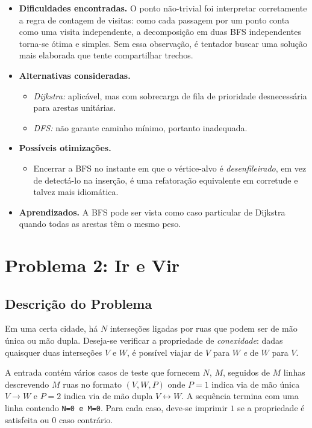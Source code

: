 \documentclass[11pt,a4paper]{article}
\begin{document}
\begin{itemize}
    \item \textbf{Dificuldades encontradas.} O ponto não-trivial foi
    interpretar corretamente a regra de contagem de visitas: como cada
    passagem por um ponto conta como uma visita independente, a
    decomposição em duas BFS independentes torna-se ótima e simples.
    Sem essa observação, é tentador buscar uma solução mais elaborada
    que tente compartilhar trechos.

    \item \textbf{Alternativas consideradas.}
    \begin{itemize}
        \item \emph{Dijkstra:} aplicável, mas com sobrecarga de fila
        de prioridade desnecessária para arestas unitárias.
        \item \emph{DFS:} não garante caminho mínimo, portanto
        inadequada.
    \end{itemize}

    \item \textbf{Possíveis otimizações.}
    \begin{itemize}
        \item Encerrar a BFS no instante em que o vértice-alvo é
        \emph{desenfileirado}, em vez de detectá-lo na inserção, é
        uma refatoração equivalente em corretude e talvez mais
        idiomática.
    \end{itemize}

    \item \textbf{Aprendizados.} A BFS pode ser vista como caso
    particular de Dijkstra quando todas as arestas têm o mesmo peso.
\end{itemize}

\section{Problema 2: Ir e Vir}

\subsection{Descrição do Problema}

Em uma certa cidade, há $N$ interseções ligadas por ruas que podem ser
de mão única ou mão dupla. Deseja-se verificar a propriedade de
\emph{conexidade}: dadas quaisquer duas interseções $V$ e $W$, é
possível viajar de $V$ para $W$ \emph{e} de $W$ para $V$.

A entrada contém vários casos de teste que fornecem $N$, $M$, seguidos de
$M$ linhas descrevendo $M$ ruas no formato $(V, W, P)$ onde $P=1$ indica via de mão única
$V \to W$ e $P=2$ indica via de mão dupla $V \leftrightarrow W$. A
sequência termina com uma linha contendo \texttt{N=0 e M=0}. Para cada
caso, deve-se imprimir $1$ se a propriedade é satisfeita ou $0$ caso
contrário.
\end{document}
